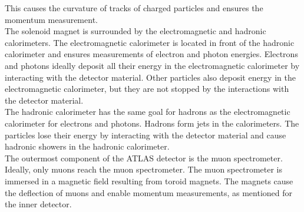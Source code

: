 This causes the curvature of tracks of charged particles and ensures the momentum measurement.\\
The solenoid magnet is surrounded by the electromagnetic and hadronic calorimeters.
The electromagnetic calorimeter is located in front of the hadronic calorimeter and ensures measurements of electron and photon energies.
Electrons and photons ideally deposit all their energy in the electromagnetic calorimeter by interacting with the detector material.
Other particles also deposit energy in the electromagnetic calorimeter, but they are not stopped by the interactions with the detector material. \\
The hadronic calorimeter has the same goal for hadrons as the electromagnetic calorimeter for electrons and photons.
Hadrons form jets in the calorimeters.
The particles lose their energy by interacting with the detector material and cause hadronic showers in the hadronic calorimeter.\\
The outermost component of the ATLAS detector is the muon spectrometer.
Ideally, only muons reach the muon spectrometer.
The muon spectrometer is immersed in a magnetic field resulting from toroid magnets.
The magnets cause the deflection of muons and enable momentum measurements, as mentioned for the inner detector.




